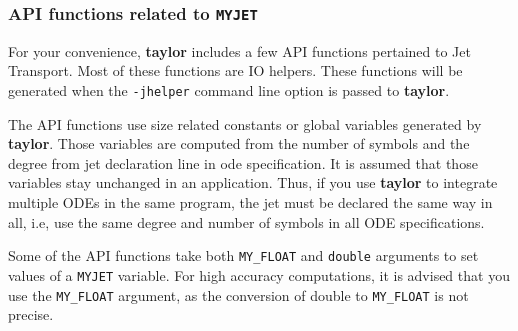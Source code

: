 \documentclass[10pt]{article}
\theoremstyle{remark}
\newcommand{\taylorname}{{\bf taylor}}
\newcommand{\myjet}{{\tt MY\symbol{95}JET}}
\begin{document}
\subsubsection*{API functions related to \myjet{}} \label{sec:myjetapi}
For your convenience, \taylorname{} includes a few API functions
pertained to Jet Transport. Most of these functions are IO
helpers. These functions will be generated when the \verb+-jhelper+
command line option is passed to \taylorname{}.

\bigskip
The API functions use size related constants or global variables
generated by \taylorname{}. Those variables are computed from the
number of symbols and the degree from jet declaration line in ode
specification.  It is assumed that those variables stay unchanged in
an application. Thus, if you use \taylorname{} to integrate multiple
ODEs in the same program, the jet must be declared the same way in
all, i.e, use the same degree and number of symbols in all ODE
specifications.

\bigskip
Some of the API functions take both \verb+MY_FLOAT+ and \verb+double+
arguments to set values of a \myjet{} variable.  For high accuracy
computations, it is advised that you use the \verb+MY_FLOAT+ argument,
as the conversion of double to \verb+MY_FLOAT+ is not precise.
\end{document}
